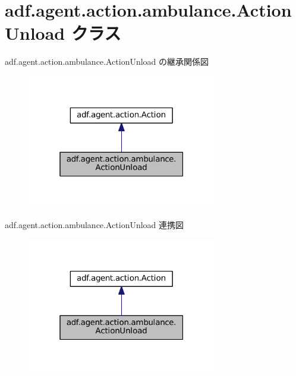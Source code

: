 \hypertarget{classadf_1_1agent_1_1action_1_1ambulance_1_1ActionUnload}{}\section{adf.\+agent.\+action.\+ambulance.\+Action\+Unload クラス}
\label{classadf_1_1agent_1_1action_1_1ambulance_1_1ActionUnload}


adf.\+agent.\+action.\+ambulance.\+Action\+Unload の継承関係図
\nopagebreak
\begin{figure}[H]
\begin{center}
\leavevmode
\includegraphics[width=235pt]{classadf_1_1agent_1_1action_1_1ambulance_1_1ActionUnload__inherit__graph}
\end{center}
\end{figure}


adf.\+agent.\+action.\+ambulance.\+Action\+Unload 連携図
\nopagebreak
\begin{figure}[H]
\begin{center}
\leavevmode
\includegraphics[width=235pt]{classadf_1_1agent_1_1action_1_1ambulance_1_1ActionUnload__coll__graph}
\end{center}
\end{figure}
